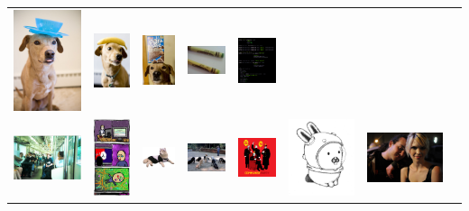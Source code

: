 \documentclass{beamer}
\begin{document}
\begin{frame}
\begin{tabular}{cccccccc}
    \includegraphics[height=.3in,width=.3in,keepaspectratio]{../images/12.jpg} &
    \includegraphics[height=.3in,width=.3in,keepaspectratio]{../images/13.jpg} &
    \includegraphics[height=.3in,width=.3in,keepaspectratio]{../images/14.jpg} &
    \includegraphics[height=.3in,width=.3in,keepaspectratio]{../images/15.jpg} &
    \includegraphics[height=.3in,width=.3in,keepaspectratio]{../images/16.png} \\ 
    \includegraphics[height=.3in,width=.3in,keepaspectratio]{../images/17.jpg} &
    \includegraphics[height=.3in,width=.3in,keepaspectratio]{../images/18.jpg} &
    \includegraphics[height=.3in,width=.3in,keepaspectratio]{../images/19.png} &
    \includegraphics[height=.3in,width=.3in,keepaspectratio]{../images/20.jpg} &
    \includegraphics[height=.3in,width=.3in,keepaspectratio]{../images/21.png} &
    \includegraphics[height=.3in,width=.3in,keepaspectratio]{../images/22.jpg} &
    \includegraphics[height=.3in,width=.3in,keepaspectratio]{../images/23.jpg} &

\end{tabular}
\end{frame}
\end{document}
